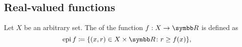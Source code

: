 \subsection{Real-valued functions}\label{subsec:real_valued_functions}

\begin{definition}\label{def:epigraph}
  Let \( X \) be an arbitrary set. The  of the function \( f: X \to \BR \) is defined as
  \begin{equation*}
    \Epi f \coloneqq \{ (x, r) \in X \times \BR \colon r \geq f(x) \},
  \end{equation*}
\end{definition}
